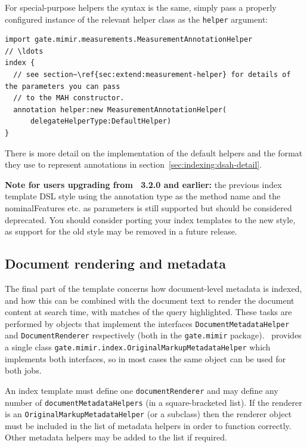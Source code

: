 For special-purpose helpers the syntax is the same, simply pass a properly
configured instance of the relevant helper class as the {\tt helper} argument:

\begin{lstlisting}[texcl]
import gate.mimir.measurements.MeasurementAnnotationHelper
// \ldots
index {
  // see section~\ref{sec:extend:measurement-helper} for details of the parameters you can pass
  // to the MAH constructor.
  annotation helper:new MeasurementAnnotationHelper(
      delegateHelperType:DefaultHelper)
}
\end{lstlisting}

There is more detail on the implementation of the default helpers and the
format they use to represent annotations in
section~\ref{sec:indexing:dsah-detail}.

{\bf Note for users upgrading from \Mimir\ 3.2.0 and earlier:} the previous
index template DSL style using the annotation type as the method name and the
nominalFeatures etc. as parameters is still supported but should be considered
deprecated.  You should consider porting your index templates to the new style,
as support for the old style may be removed in a future release.

\subsection*{Document rendering and metadata}

The final part of the template concerns how document-level metadata is indexed,
and how this can be combined with the document text to render the document
content at search time, with matches of the query highlighted.  These tasks are
performed by objects that implement the interfaces
\lstinline!DocumentMetadataHelper! and \lstinline!DocumentRenderer!
respectively (both in the \lstinline!gate.mimir! package). \Mimir\ provides a
single class \lstinline!gate.mimir.index.OriginalMarkupMetadataHelper!
which implements both interfaces, so in most cases the same object can be used
for both jobs.

An index template must define one \lstinline!documentRenderer! and may define
any number of \lstinline!documentMetadataHelpers! (in a square-bracketed list).
If the renderer is an \lstinline!OriginalMarkupMetadataHelper! (or a subclass)
then the renderer object must be included in the list of metadata helpers in
order to function correctly.  Other metadata helpers may be added to the list
if required.

